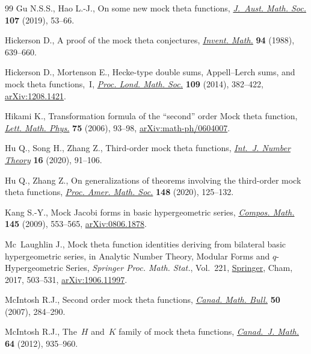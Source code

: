 \documentclass[pdftex]{sigma}
\numberwithin{equation}{section}
\begin{document}
\begin{thebibliography}{99}
Gu N.S.S., Hao L.-J., On some new mock theta functions,
  \href{https://doi.org/10.1017/s1446788718000368}{\textit{J.~Aust. Math.
  Soc.}} \textbf{107} (2019), 53--66.

Hickerson D., A proof of the mock theta conjectures,
  \href{https://doi.org/10.1007/BF01394279}{\textit{Invent. Math.}} \textbf{94}
  (1988), 639--660.

Hickerson D., Mortenson E., Hecke-type double sums, {A}ppell--{L}erch sums, and
  mock theta functions,~{I},
  \href{https://doi.org/10.1112/plms/pdu007}{\textit{Proc. Lond. Math. Soc.}}
  \textbf{109} (2014), 382--422,
  \href{http://arxiv.org/abs/1208.1421}{arXiv:1208.1421}.

Hikami K., Transformation formula of the ``second'' order {M}ock theta
  function, \href{https://doi.org/10.1007/s11005-005-0039-1}{\textit{Lett.
  Math. Phys.}} \textbf{75} (2006), 93--98,
  \href{http://arxiv.org/abs/math-ph/0604007}{arXiv:math-ph/0604007}.

Hu Q., Song H., Zhang Z., Third-order mock theta functions,
  \href{https://doi.org/10.1142/S1793042120500050}{\textit{Int.~J. Number
  Theory}} \textbf{16} (2020), 91--106.

Hu Q., Zhang Z., On generalizations of theorems involving the third-order mock
  theta functions, \href{https://doi.org/10.1090/proc/14691}{\textit{Proc.
  Amer. Math. Soc.}} \textbf{148} (2020), 125--132.

Kang S.-Y., Mock {J}acobi forms in basic hypergeometric series,
  \href{https://doi.org/10.1112/S0010437X09004060}{\textit{Compos. Math.}}
  \textbf{145} (2009), 553--565,
  \href{http://arxiv.org/abs/0806.1878}{arXiv:0806.1878}.

Mc~Laughlin J., Mock theta function identities deriving from bilateral basic
  hypergeometric series, in Analytic {N}umber {T}heory, {M}odular {F}orms and
  {$q$}-{H}ypergeometric {S}eries, \textit{Springer Proc. Math. Stat.}, Vol.~221, \href{https://doi.org/10.1007/978-3-319-68376-8_29}{Springer}, Cham,
  2017, 503--531, \href{http://arxiv.org/abs/1906.11997}{arXiv:1906.11997}.

McIntosh R.J., Second order mock theta functions,
  \href{https://doi.org/10.4153/CMB-2007-028-9}{\textit{Canad. Math. Bull.}}
  \textbf{50} (2007), 284--290.

McIntosh R.J., The~{$H$} and~{$K$} family of mock theta functions,
  \href{https://doi.org/10.4153/CJM-2011-066-0}{\textit{Canad.~J. Math.}}
  \textbf{64} (2012), 935--960.


\end{thebibliography}
\end{document}
